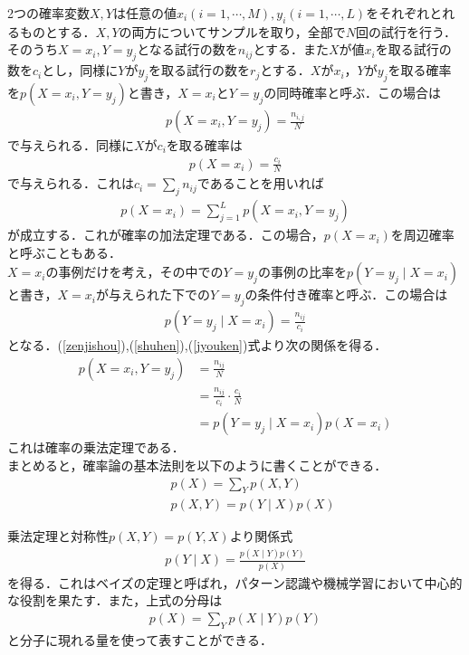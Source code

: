 \documentclass[a4j,11pt]{jsarticle}
\numberwithin{equation}{section}
\begin{document}
2つの確率変数$X,Y$は任意の値$x_i(i = 1,\cdots,M),y_i(i = 1,\cdots,L)$をそれぞれとれるものとする．$X,Y$の両方についてサンプルを取り，全部で$N$回の試行を行う．そのうち$X = x_i,Y = y_j$となる試行の数を$n_{ij}$とする．また$X$が値$x_i$を取る試行の数を$c_i$とし，同様に$Y$が$y_j$を取る試行の数を$r_j$とする．$X$が$x_i$，$Y$が$y_j$を取る確率を$p(X = x_i,Y = y_j)$と書き，$X = x_i$と$Y = y_j$の同時確率と呼ぶ．この場合は
\begin{align}
\label{zenjishou}
p(X = x_i, Y = y_j) = \frac{n_{i,j}}{N}
\end{align}
で与えられる．同様に$X$が$c_i$を取る確率は
\begin{align}
\label{shuhen}
p(X = x_i) = \frac{c_i}{N}
\end{align}
で与えられる．これは$c_i = \sum_{j}n_{ij}$であることを用いれば
\begin{align}
  p(X = x_i ) = \sum_{j=1 }^Lp(X = x_i,Y = y_j)
\end{align}
が成立する．これが確率の加法定理である．この場合，$p(X = x_i)$を周辺確率と呼ぶこともある．\\

$X = x_i$の事例だけを考え，その中での$Y = y_j$の事例の比率を$p(Y = y_j\mid X = x_i)$と書き，$X = x_i$が与えられた下での$Y = y_j$の条件付き確率と呼ぶ．この場合は
\begin{align}
\label{jyouken}
p(Y = y_j\mid X = x_i) = \frac{n_{ij}}{c_i}
\end{align}
となる．(\ref{zenjishou}),(\ref{shuhen}),(\ref{jyouken})式より次の関係を得る．
\begin{equation}
\begin{split}
  p( X = x_i,Y = y_j) &=\frac{n_{ij}}{N}\\
  &=\frac{n_{ij}}{c_i}\cdot \frac{c_i}{N}\\
  &=p(Y = y_j\mid X = x_i)p(X = x_i)
\end{split}
\end{equation}
これは確率の乗法定理である．\\
まとめると，確率論の基本法則を以下のように書くことができる．
\begin{align}
\qquad & p(X) = \sum_Y p(X,Y)\\
\qquad& p(X,Y) = p(Y\mid X)p(X)
\end{align}

乗法定理と対称性$p(X,Y) = p(Y,X)$より関係式
\begin{align}
p(Y\mid X) = \frac{p(X\mid Y)p(Y)}{p(X)}
\end{align}
を得る．これはベイズの定理と呼ばれ，パターン認識や機械学習において中心的な役割を果たす．また，上式の分母は
\begin{align}
p(X) = \sum_Y p(X\mid Y)p(Y)
\end{align}
と分子に現れる量を使って表すことができる．\\
\end{document}
